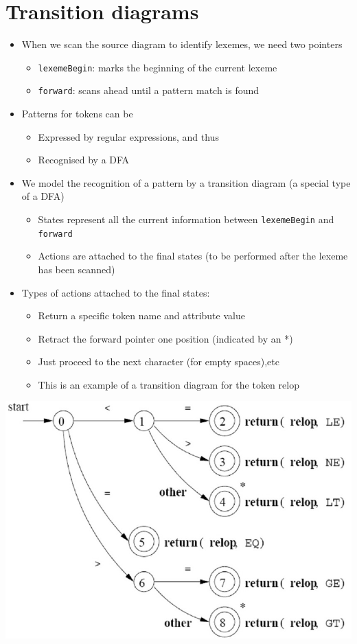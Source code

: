 \documentclass{article}[18pt]
\begin{document}
\section{Transition diagrams}
\begin{itemize}
	\item When we scan the source diagram to identify lexemes, we need two pointers
	\begin{itemize}
		\item \texttt{lexemeBegin}: marks the beginning of the current lexeme
		\item \texttt{forward}: scans ahead until a pattern match is found
	\end{itemize}
	\item Patterns for tokens can be
	\begin{itemize}
		\item Expressed by regular expressions, and thus
		\item Recognised by a DFA
	\end{itemize}
	\item We model the recognition of a pattern by a transition diagram (a special type of a DFA)
	\begin{itemize}
		\item States represent all the current information between \texttt{lexemeBegin} and \texttt{forward}
		\item Actions are attached to the final states (to be performed after the lexeme has been scanned)
	\end{itemize}
	\item Types of actions attached to the final states:
	\begin{itemize}
		\item Return a specific token name and attribute value
		\item Retract the forward pointer one position (indicated by an *)
		\item Just proceed to the next character (for empty spaces),etc
		\item This is an example of a transition diagram for the token relop
	\end{itemize}
\end{itemize}
\begin{center}
	\includegraphics[scale=0.5]{"transition diagram"}
\end{center}
\end{document}
